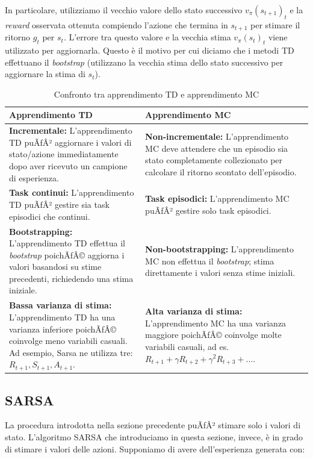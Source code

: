﻿\documentclass[11pt, a4paper]{report}
\begin{document}
In particolare, utilizziamo il vecchio valore dello stato successivo $v_\pi(s_{t+1})_t$ e la \emph{reward} osservata ottenuta compiendo l'azione che termina in $s_{t+1}$ per stimare il ritorno $g_t$ per $s_t$. L'errore tra questo valore e la vecchia stima $v_\pi(s_t)_t$ viene utilizzato per aggiornarla. Questo è il motivo per cui diciamo che i metodi TD effettuano il \emph{bootstrap} (utilizzano la vecchia stima dello stato successivo per aggiornare la stima di $s_t$).

\begin{table}[H]
\centering
\begin{tabularx}{\textwidth}{p{}|p{}}
\toprule
\textbf{Apprendimento TD} & \textbf{Apprendimento MC} \\
\midrule
\textbf{Incrementale:} L'apprendimento TD puÃƒÂ² aggiornare i valori di stato/azione immediatamente dopo aver ricevuto un campione di esperienza. & \textbf{Non-incrementale:} L'apprendimento MC deve attendere che un episodio sia stato completamente collezionato per calcolare il ritorno scontato dell'episodio. \\
\midrule
\textbf{Task continui:} L'apprendimento TD puÃƒÂ² gestire sia task episodici che continui. & \textbf{Task episodici:} L'apprendimento MC puÃƒÂ² gestire solo task episodici. \\
\midrule
\textbf{Bootstrapping:} L'apprendimento TD effettua il \emph{bootstrap} poichÃƒÂ© aggiorna i valori basandosi su stime precedenti, richiedendo una stima iniziale. & \textbf{Non-bootstrapping:} L'apprendimento MC non effettua il \emph{bootstrap}; stima direttamente i valori senza stime iniziali. \\
\midrule
\textbf{Bassa varianza di stima:} L'apprendimento TD ha una varianza inferiore poichÃƒÂ© coinvolge meno variabili casuali. Ad esempio, Sarsa ne utilizza tre: $R_{t+1}, S_{t+1}, A_{t+1}$. & \textbf{Alta varianza di stima:} L'apprendimento MC ha una varianza maggiore poichÃƒÂ© coinvolge molte variabili casuali, ad es. $R_{t+1} + \gamma R_{t+2} + \gamma^2 R_{t+3} + \dots$. \\
\bottomrule
\end{tabularx}
\caption{Confronto tra apprendimento TD e apprendimento MC}
\end{table}

\subsection{SARSA}

La procedura introdotta nella sezione precedente puÃƒÂ² stimare solo i valori di stato. L'algoritmo SARSA che introduciamo in questa sezione, invece, è in grado di stimare i valori delle azioni. Supponiamo di avere dell'esperienza generata con:
\end{document}
